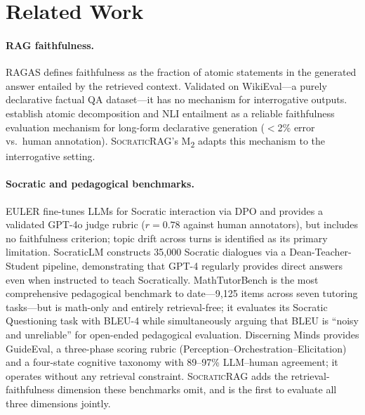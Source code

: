 \documentclass[11pt]{article}
\newcommand{\ours}{\textsc{SocraticRAG}\xspace}
\newcommand{\mtwo}{M\textsubscript{2}\xspace}
\begin{document}
\section{Related Work}

\paragraph{RAG faithfulness.}
RAGAS \citep{es2024ragas} defines faithfulness as the fraction of atomic
statements in the generated answer entailed by the retrieved context.
Validated on WikiEval---a purely declarative factual QA dataset---it has no
mechanism for interrogative outputs.
\citet{min2023factscore} establish atomic decomposition and NLI entailment
as a reliable faithfulness evaluation mechanism for long-form declarative
generation ($<$2\% error vs.\ human annotation).
\ours's \mtwo adapts this mechanism to the interrogative setting.

\paragraph{Socratic and pedagogical benchmarks.}
EULER \citep{bonino2024euler} fine-tunes LLMs for Socratic interaction via
DPO and provides a validated GPT-4o judge rubric ($r = 0.78$ against human
annotators), but includes no faithfulness criterion; topic drift across turns
is identified as its primary limitation.
SocraticLM \citep{liuj2024socraticlm} constructs 35{,}000 Socratic dialogues
via a Dean-Teacher-Student pipeline, demonstrating that GPT-4 regularly
provides direct answers even when instructed to teach Socratically.
MathTutorBench \citep{macina2025mathtutorbench} is the most comprehensive
pedagogical benchmark to date---9{,}125 items across seven tutoring
tasks---but is math-only and entirely retrieval-free; it evaluates its
Socratic Questioning task with BLEU-4 while simultaneously arguing that BLEU
is ``noisy and unreliable'' for open-ended pedagogical evaluation.
Discerning Minds \citep{liuy2025discerning} provides GuideEval, a
three-phase scoring rubric (Perception--Orchestration--Elicitation) and a
four-state cognitive taxonomy with 89--97\% LLM--human agreement; it
operates without any retrieval constraint.
\ours adds the retrieval-faithfulness dimension these benchmarks omit, and is
the first to evaluate all three dimensions jointly.

\end{document}

